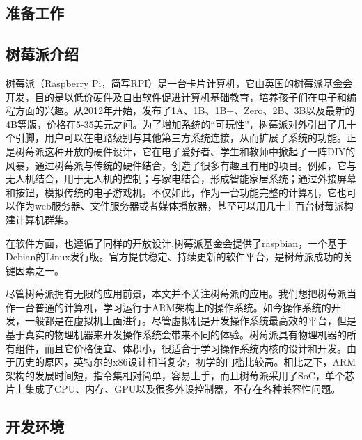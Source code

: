 \documentclass[main.tex]{subfiles}
\begin{document}
\ifxetex\else\begin{CJK*}{UTF8}{song}\fi

\chapter{准备工作}
\section{树莓派介绍}

\par
树莓派（Raspberry Pi，简写RPI）是一台卡片计算机，它由英国的树莓派基金会开发，目的是以低价硬件及自由软件促进计算机基础教育，培养孩子们在电子和编程方面的兴趣。从2012年开始，发布了1A、1B、1B+、Zero、2B、3B以及最新的4B等版，价格在5-35美元之间。为了增加系统的“可玩性”，树莓派对外引出了几十个引脚，用户可以在电路级别与其他第三方系统连接，从而扩展了系统的功能。正是树莓派这种开放的硬件设计，它在电子爱好者、学生和教师中掀起了一阵DIY的风暴，通过树莓派与传统的硬件结合，创造了很多有趣且有用的项目。例如，它与无人机结合，用于无人机的控制；与家电结合，形成智能家居系统；通过外接屏幕和按钮，模拟传统的电子游戏机。不仅如此，作为一台功能完整的计算机，它也可以作为web服务器、文件服务器或者媒体播放器，甚至可以用几十上百台树莓派构建计算机群集。

\par
在软件方面，也遵循了同样的开放设计.树莓派基金会提供了raspbian，一个基于Debian的Linux发行版。官方提供稳定、持续更新的软件平台，是树莓派成功的关键因素之一。

\par
尽管树莓派拥有无限的应用前景，本文并不关注树莓派的应用。我们想把树莓派当作一台普通的计算机，学习运行于ARM架构上的操作系统。如今操作系统的开发，一般都是在虚拟机上面进行。尽管虚拟机是开发操作系统最高效的平台，但是基于真实的物理机器来开发操作系统会带来不同的体验。树莓派具有物理机器的所有组件，而且它价格便宜、体积小，很适合于学习操作系统内核的设计和开发。由于历史的原因，英特尔的x86设计相当复杂，初学的门槛比较高。相比之下，ARM架构的发展时间短，指令集相对简单，容易上手，而且树莓派采用了SoC，单个芯片上集成了CPU、内存、GPU以及很多外设控制器，不存在各种兼容性问题。

\section{开发环境}


\end{CJK*}
\end{document}
